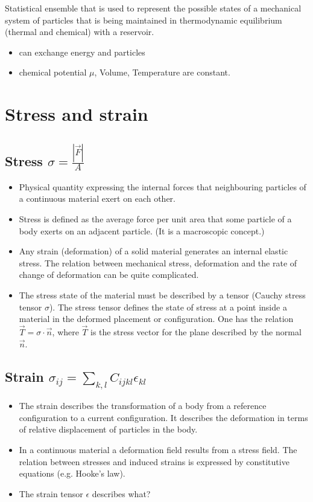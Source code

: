 \documentclass{scrartcl}
\begin{document}
Statistical ensemble that is used to represent the possible states of a
mechanical system of particles that is being maintained in
thermodynamic equilibrium (thermal and chemical) with a reservoir. 
\begin{itemize}
\item can exchange energy and particles
\item chemical potential \(\mu\), Volume, Temperature are constant.
\end{itemize}


\section{Stress and strain}

\subsection{Stress \(\sigma = \frac{|\vec{F}|}{A}\)}

\begin{itemize}
\item Physical quantity expressing the internal forces that
  neighbouring particles of a continuous material exert on each other.
\item Stress is defined as the average force per unit area that some
  particle of a body exerts on an adjacent particle. (It is a
  macroscopic concept.)
\item Any strain (deformation) of a solid material generates an
  internal elastic stress. The relation between mechanical stress, deformation and the rate
  of change of deformation can be quite complicated.
\item The stress state of the material must be described by a tensor
  (Cauchy stress tensor \(\sigma\)). The stress tensor defines the
  state of stress at a point inside a material in the deformed
  placement or configuration. One has the relation \(\vec{T} =
  \sigma\cdot \vec{n}\), where \(\vec{T}\) is the stress vector for
  the plane described by the normal \(\vec{n}\). 
\end{itemize}

\subsection{Strain \(\sigma_{ij} = \sum_{k,l} C_{ijkl}
  \epsilon_{kl}\)}

\begin{itemize}
\item The strain describes the transformation of a body from a
  reference configuration to a current configuration. It describes the
  deformation in terms of relative displacement of particles in the
  body.
\item In a continuous material a deformation field results from a
  stress field. The relation between stresses and induced strains is
  expressed by constitutive equations (e.g. Hooke's law).
\item The strain tensor \(\epsilon\) describes what?
\end{itemize}
\end{document}
